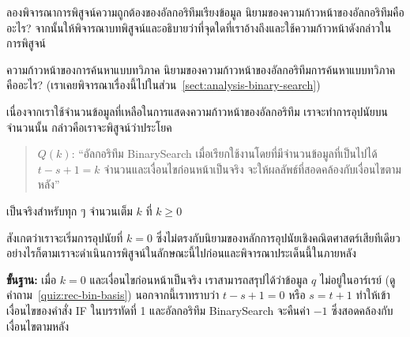 \begin{quiz}{}
ลอง{\wbr}พิจารณา{\wbr}การ{\wbr}พิสูจน์{\wbr}ความ{\wbr}ถูกต้อง{\wbr}ของ{\wbr}อัล{\wbr}กอ{\wbr}ริ{\wbr}ทึม{\wbr}เรียง{\wbr}ข้อมูล{\wbr}
นิยาม{\wbr}ของ{\wbr}ความ{\wbr}ก้าวหน้า{\wbr}ของ{\wbr}อัล{\wbr}กอ{\wbr}ริ{\wbr}ทึม{\wbr}คือ{\wbr}อะไร?
จากนั้น{\wbr}ให้{\wbr}พิจารณา{\wbr}บทพิสูจน์{\wbr}และ{\wbr}อธิบาย{\wbr}ว่า{\wbr}ที่{\wbr}จุด{\wbr}ใด{\wbr}ที่{\wbr}เรา{\wbr}อ้าง{\wbr}ถึง{\wbr}และ{\wbr}ใช้{\wbr}ความ{\wbr}ก้าวหน้า{\wbr}ดังกล่าว{\wbr}ใน{\wbr}การ{\wbr}พิสูจน์{\wbr}
\end{quiz}

\begin{quiz}{ความ{\wbr}ก้าวหน้า{\wbr}ของ{\wbr}การ{\wbr}ค้นหา{\wbr}แบบ{\wbr}ทวิภาค}
นิยาม{\wbr}ของ{\wbr}ความ{\wbr}ก้าวหน้า{\wbr}ของ{\wbr}อัล{\wbr}กอ{\wbr}ริ{\wbr}ทึม{\wbr}การ{\wbr}ค้นหา{\wbr}แบบ{\wbr}ทวิภาค{\wbr}คือ{\wbr}อะไร?
(เรา{\wbr}เคย{\wbr}พิจารณา{\wbr}เรื่อง{\wbr}นี้{\wbr}ไป{\wbr}ใน{\wbr}ส่วน~\ref{sect:analysis-binary-search})
\end{quiz}

เนื่องจาก{\wbr}เรา{\wbr}ใช้{\wbr}จำนวน{\wbr}ข้อมูล{\wbr}ที่{\wbr}เหลือ{\wbr}ใน{\wbr}การ{\wbr}แสดง{\wbr}ความ{\wbr}ก้าวหน้า{\wbr}ของ{\wbr}อัล{\wbr}กอ{\wbr}ริ{\wbr}ทึม{\wbr}
เรา{\wbr}จะ{\wbr}ทำ{\wbr}การ{\wbr}อุปนัย{\wbr}บน{\wbr}จำนวน{\wbr}นั้น กล่าวคือ{\wbr}เรา{\wbr}จะ{\wbr}พิสูจน์{\wbr}ว่า{\wbr}ประโยค{\wbr}
\begin{quote}
$Q(k)$: ``อัล{\wbr}กอ{\wbr}ริ{\wbr}ทึม BinarySearch เมื่อ{\wbr}เรียก{\wbr}ใช้{\wbr}งาน{\wbr}โดย{\wbr}ที่{\wbr}มี{\wbr}จำนวน{\wbr}ข้อมูล{\wbr}ที่{\wbr}เป็น{\wbr}ไป{\wbr}ได้ $t-s+1 = k$ จำนวน{\wbr}และ{\wbr}เงื่อนไข{\wbr}ก่อนหน้า{\wbr}เป็นจริง จะ{\wbr}ให้{\wbr}ผลลัพธ์{\wbr}ที่{\wbr}สอดคล้อง{\wbr}กับ{\wbr}เงื่อนไข{\wbr}ตาม{\wbr}หลัง''
\end{quote}
เป็นจริง{\wbr}สำหรับ{\wbr}ทุก ๆ จำนวนเต็ม $k$ ที่ $k\geq 0$

สังเกต{\wbr}ว่า{\wbr}เรา{\wbr}จะ{\wbr}เริ่ม{\wbr}การ{\wbr}อุปนัย{\wbr}ที่ $k=0$
ซึ่ง{\wbr}ไม่{\wbr}ตรง{\wbr}กับ{\wbr}นิยาม{\wbr}ของ{\wbr}หลักการ{\wbr}อุปนัย{\wbr}เชิง{\wbr}คณิตศาสตร์{\wbr}เสียที{\wbr}เดียว{\wbr}
อย่างไรก็ตาม{\wbr}เรา{\wbr}จะ{\wbr}ดำเนินการ{\wbr}พิสูจน์{\wbr}ใน{\wbr}ลักษณะ{\wbr}นี้{\wbr}ไป{\wbr}ก่อน{\wbr}และ{\wbr}พิจารณา{\wbr}ประเด็น{\wbr}นี้{\wbr}ใน{\wbr}ภายหลัง{\wbr}

{\bf ขั้น{\wbr}ฐาน:} เมื่อ $k=0$ และ{\wbr}เงื่อนไข{\wbr}ก่อนหน้า{\wbr}เป็นจริง เรา{\wbr}สามารถ{\wbr}สรุป{\wbr}ได้{\wbr}ว่า{\wbr}ข้อมูล $q$
ไม่{\wbr}อยู่{\wbr}ใน{\wbr}อาร์เรย์ (ดู{\wbr}คำถาม~\ref{quiz:rec-bin-basis}) นอกจากนี้{\wbr}เรา{\wbr}ทราบ{\wbr}ว่า{\wbr}
$t-s+1=0$ หรือ $s=t+1$ ทำ{\wbr}ให้{\wbr}เข้า{\wbr}เงื่อนไข{\wbr}ของ{\wbr}คำสั่ง IF ใน{\wbr}บรรทัด{\wbr}ที่ 1 และ{\wbr}อัล{\wbr}กอ{\wbr}ริ{\wbr}ทึม{\wbr}
BinarySearch จะ{\wbr}คืน{\wbr}ค่า $-1$ ซึ่ง{\wbr}สอดคล้อง{\wbr}กับ{\wbr}เงื่อนไข{\wbr}ตาม{\wbr}หลัง{\wbr}

